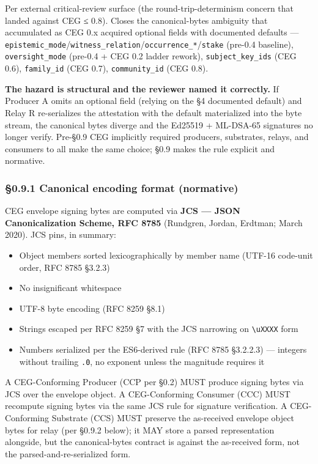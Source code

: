 \documentclass[11pt]{article}
\begin{document}
Per external critical-review surface (the round-trip-determinism concern that landed against CEG ≤ 0.8). Closes the canonical-bytes ambiguity that accumulated as CEG 0.x acquired optional fields with documented defaults — \texttt{epistemic\_mode}/\texttt{witness\_relation}/\texttt{occurrence\_*}/\texttt{stake} (pre-0.4 baseline), \texttt{oversight\_mode} (pre-0.4 + CEG 0.2 ladder rework), \texttt{subject\_key\_ids} (CEG 0.6), \texttt{family\_id} (CEG 0.7), \texttt{community\_id} (CEG 0.8).


\textbf{The hazard is structural and the reviewer named it correctly.} If Producer A omits an optional field (relying on the §4 documented default) and Relay R re-serializes the attestation with the default materialized into the byte stream, the canonical bytes diverge and the Ed25519 + ML-DSA-65 signatures no longer verify. Pre-§0.9 CEG implicitly required producers, substrates, relays, and consumers to all make the same choice; §0.9 makes the rule explicit and normative.


\subsubsection*{§0.9.1 Canonical encoding format (normative)}


CEG envelope signing bytes are computed via \textbf{JCS — JSON Canonicalization Scheme, RFC 8785} (Rundgren, Jordan, Erdtman; March 2020). JCS pins, in summary:


\begin{itemize}\setlength\itemsep{0pt}
\item Object members sorted lexicographically by member name (UTF-16 code-unit order, RFC 8785 §3.2.3)
\item No insignificant whitespace
\item UTF-8 byte encoding (RFC 8259 §8.1)
\item Strings escaped per RFC 8259 §7 with the JCS narrowing on \texttt{\textbackslash{}uXXXX} form
\item Numbers serialized per the ES6-derived rule (RFC 8785 §3.2.2.3) — integers without trailing \texttt{.0}, no exponent unless the magnitude requires it
\end{itemize}


A CEG-Conforming Producer (CCP per §0.2) MUST produce signing bytes via JCS over the envelope object. A CEG-Conforming Consumer (CCC) MUST recompute signing bytes via the same JCS rule for signature verification. A CEG-Conforming Substrate (CCS) MUST preserve the as-received envelope object bytes for relay (per §0.9.2 below); it MAY store a parsed representation alongside, but the canonical-bytes contract is against the as-received form, not the parsed-and-re-serialized form.
\end{document}
